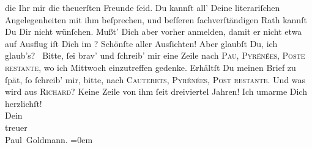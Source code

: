 \begin{ledgroupsized}[t]{13cm}
               die Ihr mir die theuerſten Freunde ſeid. Du kannſt all’ Deine literariſchen Angelegenheiten mit ihm
               beſprechen, und beſſeren ſachverſtändigen Rath kannſt Du Dir {\pb}nicht wünſchen. Mußt’ Dich aber vorher anmelden,
               damit er nicht etwa auf Ausflug iſt{\dotsfour}\pend
           \pstart
           Dich im \label{K_L02701-4v}\label{K_L02701-4h}? Schönſte aller Ausſichten! Aber
               glaubſt Du, ich glaub’s? {\dotsfour}\pend
           \pstart
           Bitte, ſei brav’ und ſchreib’ mir eine Zeile nach \textsc{Pau}, \textsc{Pyrénées}, \textsc{Poste restante}, wo ich Mittwoch einzutreffen gedenke. Erhältſt Du {\pb}meinen Brief zu ſpät, ſo ſchreib’ mir, bitte, nach
                  \textsc{Cauterets}, \textsc{}{ }\textsc{Pyrénées}, \textsc{Post restante}.\pend
           \pstart
           Und was wird aus \textsc{Richard}? Keine Zeile von ihm ſeit dreiviertel Jahren!\pend
           \pstart
           Ich umarme Dich herzlichſt! {\\[\baselineskip]}Dein {\\[\baselineskip]}treuer {\\[\baselineskip]}\spacefill\mbox{Paul Goldmann.}\pend
           \leftskip=0em{}
         
         \endnumbering{}\end{ledgroupsized}  \newcommand{\dateiname}{L02701}\newcommand{\titel}{Paul Goldmann an Arthur Schnitzler, 5. 8. [1892]}\newcommand{\editorInnen}{Martin Anton Müller und Laura Untner}
      
